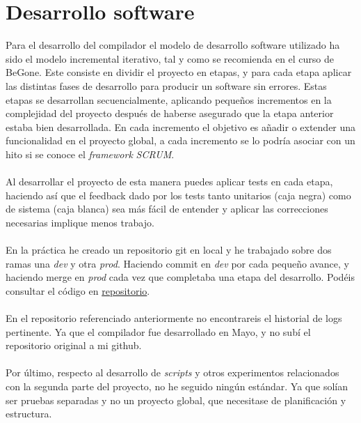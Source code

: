 \section{Desarrollo software}
Para el desarrollo del compilador el modelo de desarrollo software utilizado ha sido el modelo incremental iterativo, tal y como se recomienda en el curso de BeGone. Este consiste en dividir el proyecto en etapas, y para cada etapa aplicar las distintas fases de desarrollo para producir un software sin errores. Estas etapas se desarrollan secuencialmente, aplicando pequeños incrementos en la complejidad del proyecto después de haberse asegurado que la etapa anterior estaba bien desarrollada. En cada incremento el objetivo es añadir o extender una funcionalidad en el proyecto global, a cada incremento se lo podría asociar con un hito si se conoce el \textit{framework} \textit{SCRUM}. \\\\
Al desarrollar el proyecto de esta manera puedes aplicar tests en cada etapa, haciendo así que el feedback dado por los tests tanto unitarios (caja negra) como de sistema (caja blanca) sea más fácil de entender y aplicar las correcciones necesarias implique menos trabajo. \\\\
En la práctica he creado un repositorio git en local y he trabajado sobre dos ramas una \textit{dev} y otra \textit{prod}. Haciendo commit en \textit{dev} por cada pequeño avance, y haciendo merge en \textit{prod} cada vez que completaba una etapa del desarrollo. Podéis consultar el código en \href{https://github.com/domingoUnican/TFGPedroCastro/tree/main/code}{repositorio}. \\\\
En el repositorio referenciado anteriormente no encontrareis el historial de logs pertinente. Ya que el compilador fue desarrollado en Mayo, y no subí el repositorio original a mi github. \\\\
Por último, respecto al desarrollo de \textit{scripts} y otros experimentos relacionados con la segunda parte del proyecto, no he seguido ningún estándar. Ya que solían ser pruebas separadas y no un proyecto global, que necesitase de planificación y estructura.